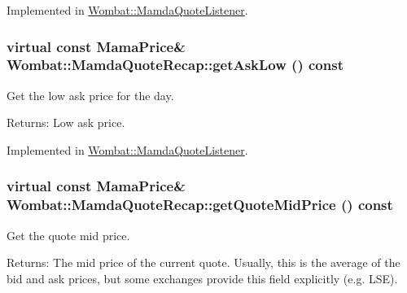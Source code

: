 Implemented in \hyperlink{classWombat_1_1MamdaQuoteListener_44860382a77a09c7fcca4bcd2e92e1ae}{Wombat::Mamda\-Quote\-Listener}.\hypertarget{classWombat_1_1MamdaQuoteRecap_0d1047a74037b9bf740e1ac49e602ae2}{
\subsubsection[getAskLow]{\setlength{\rightskip}{0pt plus 5cm}virtual const Mama\-Price\& Wombat::Mamda\-Quote\-Recap::get\-Ask\-Low () const}}
\label{classWombat_1_1MamdaQuoteRecap_0d1047a74037b9bf740e1ac49e602ae2}


Get the low ask price for the day. 

\begin{Desc}
\item[Returns:]Low ask price. \end{Desc}


Implemented in \hyperlink{classWombat_1_1MamdaQuoteListener_5c3d63363fd9894fc2949fd769b3af00}{Wombat::Mamda\-Quote\-Listener}.\hypertarget{classWombat_1_1MamdaQuoteRecap_5db663146079f9fd6127cd8f6ed05515}{
\subsubsection[getQuoteMidPrice]{\setlength{\rightskip}{0pt plus 5cm}virtual const Mama\-Price\& Wombat::Mamda\-Quote\-Recap::get\-Quote\-Mid\-Price () const}}
\label{classWombat_1_1MamdaQuoteRecap_5db663146079f9fd6127cd8f6ed05515}


Get the quote mid price. 

\begin{Desc}
\item[Returns:]The mid price of the current quote. Usually, this is the average of the bid and ask prices, but some exchanges provide this field explicitly (e.g. LSE). \end{Desc}


